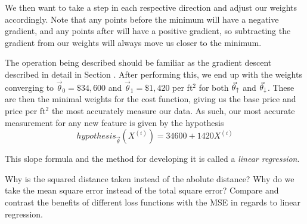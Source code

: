 
We then want to take a step in each respective direction and adjust our weights accordingly. Note that any points before the minimum will have a negative gradient, and any points after will have a positive gradient, so subtracting the gradient from our weights will always move us closer to the minimum.

The operation being described should be familiar as the gradient descent described in detail in Section \placeholder. After performing this, we end up with the weights converging to 
$\vec\theta_0 = \$34,600$ and $\vec\theta_1 = \$1,420$ per ft$^2$ for both $\vec\theta_{\uparrow}$ and $\vec\theta_{\downarrow}$. These are then the minimal weights for the cost function, giving us the base price and price per ft$^2$ the most accurately measure our data. As such, our most accurate measurement for any new feature is given by the hypothesis
\begin{equation}
	hypothesis_{\vec\theta}(X^{(i)}) = 34600 + 1420X^{(i)}	
\end{equation}

This slope formula and the method for developing it is called a \emph{linear regression}.





\begin{exercise}
    \ex Why is the squared distance taken instead of the abolute distance?
    \ex Why do we take the mean square error instead of the total square error?
    \ex Compare and contrast the benefits of different loss functions with the
    MSE in regards to linear regression.
\end{exercise}
